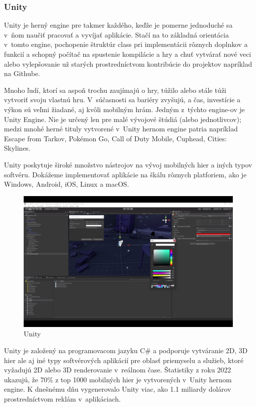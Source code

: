 \subsubsection{Unity}

Unity je herný engine pre takmer každého, keďže je pomerne jednoduché sa v~ňom naučiť pracovať a vyvíjať aplikácie. Stačí na to základná orientácia v~tomto engine, pochopenie štruktúr class pri implementácii rôznych doplnkov a funkcií a schopný počítač na spustenie kompilácie a hry a chuť vytvárať nové veci alebo vylepšovanie už starých prostredníctvom kontribúcie do projektov napríklad na Githube.

Mnoho ľudí, ktorí sa aspoň trochu zaujímajú o hry, túžilo alebo stále túži vytvoriť svoju vlastnú hru. V~súčasnosti sa bariéry zvyšujú, a čas, investície a výkon sú veľmi žiadané, aj kvôli mobilným hrám. Jedným z~týchto engine-ov je Unity Engine. Nie je určený len pre malé vývojové štúdiá (alebo jednotlivcov); medzi mnohé herné tituly vytvorené v~Unity hernom engine patria napríklad Escape from Tarkov, Pokémon Go, Call of Duty Mobile, Cuphead, Cities: Skylines.%

Unity poskytuje široké množstvo nástrojov na vývoj mobilných hier a iných typov softvéru. Dokážeme implementovať aplikácie na škálu rôznych platforiem, ako je Windows, Android, iOS, Linux a macOS. 

\begin{figure}[h]
\centering
\includegraphics[width=1\textwidth]{img/unityEditor.png}
\caption{Unity \cite{unityscreenshot}}
\label{fig:unityEditor}
\end{figure}

Unity je založený na programovacom jazyku C\# a podporuje vytváranie 2D, 3D hier ale aj iné typy softvérových aplikácií pre oblasť priemyselu a služieb, ktoré vyžadujú 2D alebo 3D renderovanie v~reálnom čase. Štatistiky z roku 2022 ukazujú, že 70\% z top 1000 mobilných hier je vytvorených v~Unity hernom engine. K dnešnému dňu vygenerovalo Unity viac, ako 1.1 miliardy dolárov prostredníctvom reklám v~aplikáciach.

